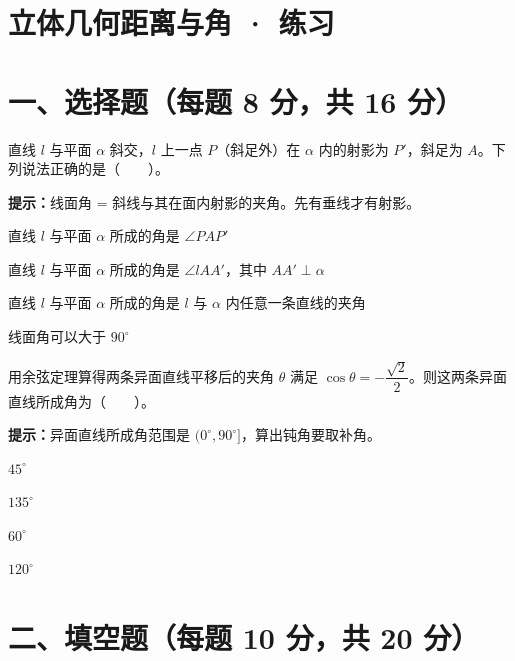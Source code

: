 \documentclass{exam-zh}
\begin{document}
\section*{立体几何距离与角 · 练习}

\section*{一、选择题（每题 8 分，共 16 分）}


\begin{question}[points=8]
  直线 $l$ 与平面 $\alpha$ 斜交，$l$ 上一点 $P$（斜足外）在 $\alpha$ 内的射影为 $P'$，斜足为 $A$。下列说法正确的是（　　）。
  \begin{hintbox}
\textbf{提示：}线面角 = 斜线与其在面内射影的夹角。先有垂线才有射影。\end{hintbox}

  \begin{choices}
    \item 直线 $l$ 与平面 $\alpha$ 所成的角是 $\angle PAP'$
    \item 直线 $l$ 与平面 $\alpha$ 所成的角是 $\angle lAA'$，其中 $AA'\perp\alpha$
    \item 直线 $l$ 与平面 $\alpha$ 所成的角是 $l$ 与 $\alpha$ 内任意一条直线的夹角
    \item 线面角可以大于 $90^\circ$
  \end{choices}
\end{question}



\begin{question}[points=8]
  用余弦定理算得两条异面直线平移后的夹角 $\theta$ 满足 $\cos\theta=-\dfrac{\sqrt2}{2}$。则这两条异面直线所成角为（　　）。
  \begin{hintbox}
\textbf{提示：}异面直线所成角范围是 $(0^\circ,90^\circ]$，算出钝角要取补角。\end{hintbox}

  \begin{choices}
    \item $45^\circ$
    \item $135^\circ$
    \item $60^\circ$
    \item $120^\circ$
  \end{choices}
\end{question}


\section*{二、填空题（每题 10 分，共 20 分）}
\end{document}
